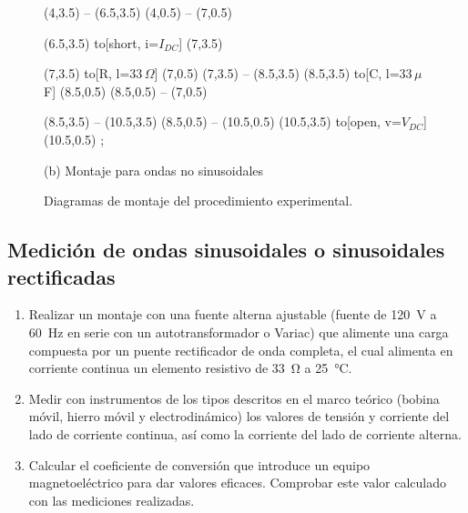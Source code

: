 \begin{figure}[H]
\begin{minipage}{0.48\textwidth}
\begin{circuitikz}[american, scale=0.6, transform shape]
    (4,3.5) -- (6.5,3.5)
    (4,0.5) -- (7,0.5)
    
    (6.5,3.5) to[short, i=$I_{DC}$] (7,3.5)
    
    (7,3.5) to[R, l=$33\,\Omega$] (7,0.5)
    (7,3.5) -- (8.5,3.5)
    (8.5,3.5) to[C, l=$33\,\mu$F] (8.5,0.5)
    (8.5,0.5) -- (7,0.5)
    
    (8.5,3.5) -- (10.5,3.5)
    (8.5,0.5) -- (10.5,0.5)
    (10.5,3.5) to[open, v=$V_{DC}$] (10.5,0.5)
    ;
\end{circuitikz}
\vspace{0.3cm}
\par (b) Montaje para ondas no sinusoidales
\end{minipage}
\caption{Diagramas de montaje del procedimiento experimental.}
\label{fig:montajes-experimentales}
\end{figure}

\subsection{Medición de ondas sinusoidales o sinusoidales rectificadas}
\begin{enumerate}
    \item Realizar un montaje con una fuente alterna ajustable (fuente de \SI{120}{V} a \SI{60}{Hz} en serie con un autotransformador o Variac) que alimente una carga compuesta por un puente rectificador de onda completa, el cual alimenta en corriente continua un elemento resistivo de \SI{33}{\ohm} a \SI{25}{\celsius}.
    \item Medir con instrumentos de los tipos descritos en el marco teórico (bobina móvil, hierro móvil y electrodinámico) los valores de tensión y corriente del lado de corriente continua, así como la corriente del lado de corriente alterna.
    \item Calcular el coeficiente de conversión que introduce un equipo magnetoeléctrico para dar valores eficaces. Comprobar este valor calculado con las mediciones realizadas.
\end{enumerate}

